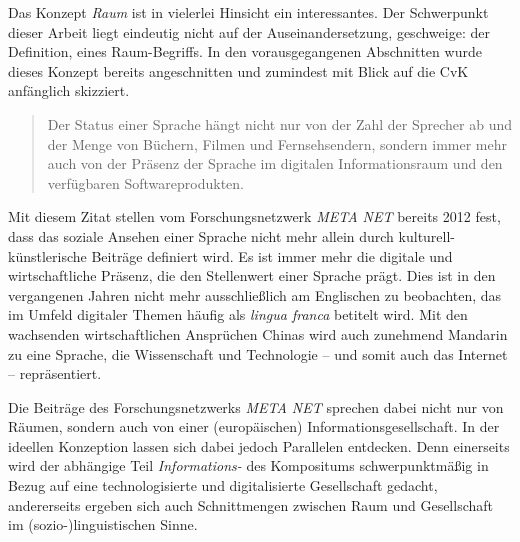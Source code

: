 
Das Konzept \emph{Raum} ist in vielerlei Hinsicht ein interessantes. Der Schwerpunkt dieser Arbeit liegt eindeutig nicht auf der Auseinandersetzung, geschweige: der Definition, eines Raum-Begriffs. In den vorausgegangenen Abschnitten wurde dieses Konzept bereits angeschnitten und zumindest mit Blick auf die CvK anfänglich skizziert.

\begin{quote}
Der Status einer Sprache hängt nicht nur von der Zahl der Sprecher ab und der Menge von Büchern, Filmen und Fernsehsendern, sondern immer mehr auch von der Präsenz der Sprache im digitalen Informationsraum und den verfügbaren Softwareprodukten. \citep[2]{burchardt_deutsche_2012}
\end{quote}

Mit diesem Zitat stellen \citet[]{burchardt_deutsche_2012} vom Forschungsnetzwerk \emph{META NET} bereits 2012 fest, dass das soziale Ansehen einer Sprache nicht mehr allein durch kulturell-künstlerische Beiträge definiert wird. Es ist immer mehr die digitale und wirtschaftliche Präsenz, die den Stellenwert einer Sprache prägt. Dies ist in den vergangenen Jahren nicht mehr ausschließlich am Englischen zu beobachten, das im Umfeld digitaler Themen häufig als \emph{lingua franca} betitelt wird. Mit den wachsenden wirtschaftlichen Ansprüchen Chinas wird auch zunehmend Mandarin zu eine Sprache, die Wissenschaft und Technologie -- und somit auch das Internet -- repräsentiert.

Die Beiträge des Forschungsnetzwerks \emph{META NET} sprechen dabei nicht nur von Räumen, sondern auch von einer (europäischen) Informationsgesellschaft. In der ideellen Konzeption lassen sich dabei jedoch Parallelen entdecken. Denn einerseits wird der abhängige Teil \emph{Informations-} des Kompositums schwerpunktmäßig in Bezug auf eine technologisierte und digitalisierte Gesellschaft gedacht, andererseits ergeben sich auch Schnittmengen zwischen Raum und Gesellschaft im (sozio-)linguistischen Sinne.

